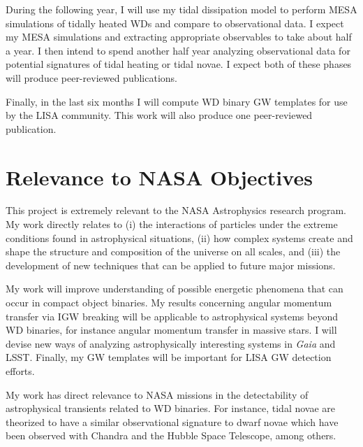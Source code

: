 \documentclass[12pt,
        usenames, %
        dvipsnames %
    ]{article}
\begin{document}
During the following year, I will use my tidal dissipation model to perform MESA
simulations of tidally heated WDs and compare to observational data. I expect my
MESA simulations and extracting appropriate observables to take about half a
year. I then intend to spend another half year analyzing observational data for
potential signatures of tidal heating or tidal novae. I expect both of these
phases will produce peer-reviewed publications.

Finally, in the last six months I will compute WD binary GW templates for use by
the LISA community. This work will also produce one peer-reviewed publication.

\section{Relevance to NASA Objectives}

This project is extremely relevant to the NASA Astrophysics research program.
My work directly relates to (i) the interactions of particles under the extreme
conditions found in astrophysical situations, (ii) how complex systems create
and shape the structure and composition of the universe on all scales, and (iii)
the development of new techniques that can be applied to future major missions.

My work will improve understanding of possible energetic phenomena that can
occur in compact object binaries. My results concerning angular momentum
transfer via IGW breaking will be applicable to astrophysical systems beyond WD
binaries, for instance angular momentum transfer in massive
stars\cite{l_trans_rev}. I will devise new ways of analyzing astrophysically
interesting systems in \emph{Gaia} and LSST\@. Finally, my GW templates will be
important for LISA GW detection efforts.

My work has direct relevance to NASA missions in the detectability of
astrophysical transients related to WD binaries. For instance, tidal novae are
theorized to have a similar observational signature to dwarf novae which have
been observed with Chandra and the Hubble Space Telescope, among others.

\clearpage

\printbibliography
\end{document}
